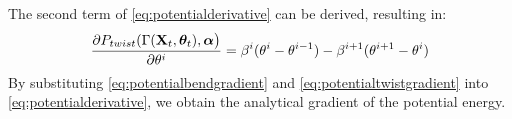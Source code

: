 The second term of \eqref{eq:potentialderivative} can be derived, resulting in:
\begin{equation}
        \label{eq:potentialtwistgradient}
        \frac{\partial P_{twist}(\Gamma(\mathbf{X}_t, \bm{\theta}_t), \bm{\alpha}\bigr)}{\partial \theta^i} = \beta^i (\theta^i - \theta^{i-1}) - \beta^{i+1}(\theta^{i+1} - \theta^{i})
\end{equation}
By substituting \eqref{eq:potentialbendgradient} and \eqref{eq:potentialtwistgradient} into \eqref{eq:potentialderivative}, we obtain the analytical gradient of the potential energy.
